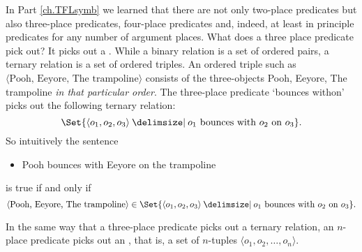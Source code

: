 In Part \ref{ch.TFLsymb} we learned that there are not only two-place predicates but also three-place predicates, four-place predicates and, indeed, at least in principle predicates for any number of argument places. What does a three place predicate pick out? It picks out a . While a binary relation is a set of ordered pairs, a ternary relation is a set of ordered triples. An ordered triple such as $\langle\text{Pooh, Eeyore, The trampoline}\rangle$ consists of the three-objects Pooh, Eeyore, The trampoline \emph{in that particular order}. The three-place predicate `bounces withon' picks out the following ternary relation:
$$\Set{\langle o_1,o_2,o_3\rangle \given o_1\text{ bounces with }o_2\text{ on }o_3}.$$
So intuitively the sentence 
\begin{itemize}
\item Pooh bounces with Eeyore on the trampoline
\end{itemize}
is true if and only if
$$\langle\text{Pooh, Eeyore, The trampoline}\rangle\in\Set{\langle o_1,o_2,o_3\rangle \given o_1\text{ bounces with }o_2\text{ on }o_3}.$$

In the same way that a three-place predicate picks out a ternary relation, an $n$-place predicate picks out an , that is, a set of $n$-tuples $\langle o_1,o_2,\ldots,o_n\rangle$.


%

